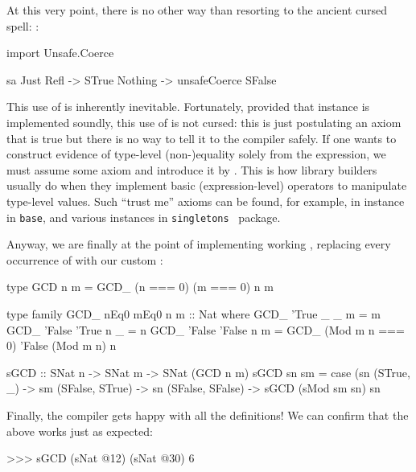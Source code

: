 \documentclass[demotion-paper.tex]{subfiles}
\begin{document}
At this very point, there is no other way than resorting to the ancient cursed spell: :

\begin{code}
import Unsafe.Coerce

sa %
  Just Refl -> STrue
  Nothing -> unsafeCoerce SFalse  
\end{code}

This use of  is inherently inevitable.
Fortunately, provided that  instance is implemented soundly, this use of  is not cursed: this is just postulating an axiom that is true but there is no way to tell it to the compiler safely.
If one wants to construct evidence of type-level (non-)equality solely from the expression, we must assume some axiom and introduce it by .
This is how library builders usually do when they implement basic (expression-level) operators to manipulate type-level values.
Such ``trust me'' axioms can be found, for example, in  instance in \texttt{base}, and various  instances in \texttt{singletons}~\cite{singletons} package.

Anyway, we are finally at the point of implementing working , replacing every occurrence of \hask{(==)} with our custom \hask{(===)}:

\begin{code}
type GCD n m = GCD_ (n === 0) (m === 0) n m

type family GCD_ nEq0 mEq0 n m :: Nat where
  GCD_ 'True  _      _ m = m
  GCD_ 'False 'True  n _ = n
  GCD_ 'False 'False n m = 
    GCD_ (Mod m n === 0) 'False (Mod m n) n

sGCD :: SNat n -> SNat m -> SNat (GCD n m)
sGCD sn sm =
  case (sn %
    (STrue, _) -> sm
    (SFalse, STrue) -> sn
    (SFalse, SFalse) -> sGCD (sMod sm sn) sn
\end{code}

Finally, the compiler gets happy with all the definitions!
We can confirm that the above  works just as expected:
\begin{repl}
>>> sGCD (sNat @12) (sNat @30)
6
\end{repl}
\end{document}

